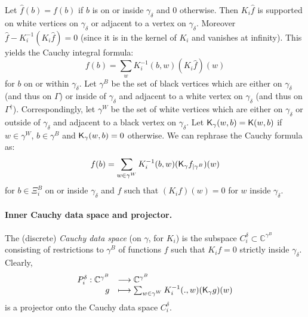 \documentclass[10pt]{article}
\newcommand{\C}{\mathbb{C}}
\newcommand{\rK}{{\sf K}}
\newcommand{\dg}{\dagger}
\begin{document}
Let $\hat f(b)=f(b)$ if $b$ is on or inside $\gamma_\delta$ and $0$ otherwise. Then $K_i\hat f$ is supported on white vertices on $\gamma_\delta$ or adjacent to a vertex on $\gamma_\delta$. Moreover $\hat f-K_i^{-1}(K_i\hat f)=0$ (since it is in the kernel of $K_i$ and vanishes at infinity). This yields the Cauchy integral formula:
$$f(b)=\sum_w K_i^{-1}(b,w)(K_i\hat f)(w)$$
for $b$ on or within $\gamma_\delta$. Let $\gamma^B$ be the set of black vertices which are either on $\gamma_\delta$ (and thus on $\Gamma$) or inside of $\gamma_\delta$ and adjacent to a white vertex on $\gamma_\delta$ (and thus on $\Gamma^\dg$). Correspondingly, let $\gamma^W$ be the set of white vertices which are either on $\gamma_\delta$ or outside of $\gamma_\delta$ and adjacent to a black vertex on $\gamma_\delta$. Let $\rK_{\gamma}(w,b)=\rK(w,b)$ if $w\in\gamma^W$, $b\in\gamma^B$ and $\rK_\gamma(w,b)=0$ otherwise. We can rephrase the Cauchy formula as:
\begin{equation}\label{eq:discrcauchform}
f(b)=\sum_{w\in\gamma^W}K_i^{-1}(b,w)(\rK_\gamma f_{|\gamma^B})(w)
\end{equation}
for $b\in\Xi_i^B$ on or inside $\gamma_\delta$ and $f$ such that $(K_if)(w)=0$ for $w$ inside $\gamma_\delta$. 


\paragraph{Inner Cauchy data space and projector.} 
The (discrete) {\em Cauchy data space} (on $\gamma$, for $K_i$) is the subspace $C_i^\delta\subset\C^{\gamma^B}$ consisting of restrictions to $\gamma^B$ of functions $f$ such that $K_if=0$ strictly inside $\gamma_\delta$. Clearly, 
\begin{equation}\label{eq:surgdiscrcald}
\begin{array}{rl}
P_i^\delta:\C^{\gamma^B}&\longrightarrow \C^{\gamma^B}\\
g&\longmapsto\sum_{w\in\gamma^W}K_i^{-1}(.,w)(\rK_\gamma g)(w)
\end{array}
\end{equation}
is a projector onto the Cauchy data space $C_i^\delta$. 
\end{document}
